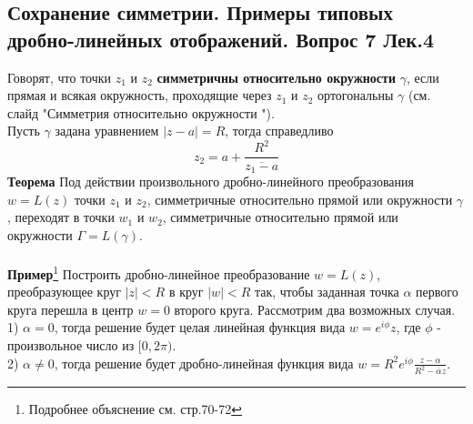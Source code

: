 \documentclass{article}
\begin{document}
\subsection{Сохранение симметрии. Примеры типовых дробно-линейных отображений. Вопрос 7 Лек.4}
	Говорят, что точки $ z_{1} $ и $ z_{2} $ \textbf{симметричны относительно окружности} $ \gamma $, если прямая и всякая окружность, проходящие через ${z}_{1}$ и $ z_{2} $ ортогональны $ \gamma $ (см. слайд "Симметрия относительно окружности ").\\
	Пусть $\gamma$ задана уравнением $|z-a|=R$, тогда справедливо
	\begin{equation}
	{z}_{2}=a+\frac{{R}^{2}}{\overline{{z}_{1}-a}}
	\end{equation}
	\textbf{Теорема} Под действии произвольного дробно-линейного преобразования $w=L(z)$ точки ${z}_{1}$ и ${z}_{2}$, симметричные относительно прямой или окружности $\gamma$, переходят в точки ${w}_{1}$ и ${w}_{2}$, симметричные относительно прямой или окружности $\Gamma=L(\gamma)$.\\
	\\
	\textbf{Пример}\footnote{Подробнее объяснение см. стр.70-72} Построить дробно-линейное преобразование $ w=L(z)$, преобразующее круг $ |z|<R $ в круг $ |w|<R $ так, чтобы заданная точка $ \alpha $ первого круга перешла в центр $ w=0 $ второго круга. Рассмотрим два возможных случая.\\
	1) $\alpha=0$, тогда решение будет целая линейная функция вида $w={e}^{i\phi}z$, где $\phi$ - произвольное число из $[0,2\pi)$.\\
	2) $\alpha\ne0$, тогда решение будет дробно-линейная функция вида $w={R}^{2}{e}^{i\phi}\frac{z-\alpha}{{R}^{2}-\overline{\alpha}z}$.\\
\end{document}
